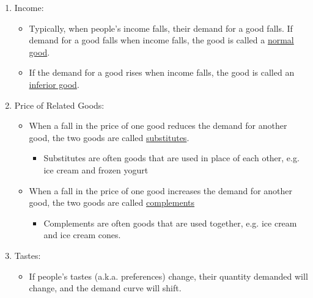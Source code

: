 	\begin{enumerate}
	
	\item Income: 
	
		\begin{itemize}
		
		\item Typically, when people's income falls, their demand for a good falls. If demand for a good falls when income falls, the good is called a \underline{normal good}.
		
		\item If the demand for a good rises when income falls, the good is called an \underline{inferior good}.  
		
		\end{itemize}
		
	\item Price of Related Goods:
	
		\begin{itemize}
		
		\item When a fall in the price of one good reduces the demand for another good, the two goods are called \underline{substitutes}. 
		
			\begin{itemize}
			
			\item Substitutes are often goods that are used in place of each other, e.g. ice cream and frozen yogurt
			
			\end{itemize}
		
		\item When a fall in the price of one good increases the demand for another good, the two goods are called \underline{complements}
		
			\begin{itemize}
			
			\item Complements are often goods that are used together, e.g. ice cream and ice cream cones.
			
			\end{itemize}
		
		\end{itemize}
		
	\item Tastes:
	
		\begin{itemize}
		
		\item If people's tastes (a.k.a. preferences) change, their quantity demanded will change, and the demand curve will shift.
		

\end{itemize}
\end{enumerate}
